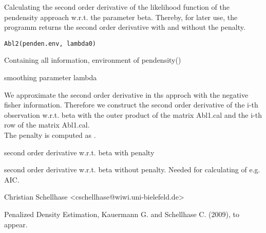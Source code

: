 \begin{Description}\relax
Calculating the second order derivative of the likelihood function of the pendensity approach w.r.t. the parameter beta. Thereby, for later use, the programm returns the second order derivative with and without the penalty.
\end{Description}
\begin{Usage}
\begin{verbatim}
Abl2(penden.env, lambda0)
\end{verbatim}
\end{Usage}
\begin{Arguments}
\begin{ldescription}
\item[\code{penden.env}] Containing all information, environment of pendensity()
\item[\code{lambda0}] smoothing parameter lambda
\end{ldescription}
\end{Arguments}
\begin{Details}\relax
We approximate the second order derivative in ths approch with the negative fisher information. 
Therefore we construct the second order derivative of the i-th observation w.r.t. beta with the outer product of the matrix Abl1.cal and the i-th row of the matrix Abl1.cal.\\
The penalty is computed as .
\end{Details}
\begin{Value}
\begin{ldescription}
\item[\code{Abl2.pen}] second order derivative w.r.t. beta with penalty
\item[\code{Abl2.cal}] second order derivative w.r.t. beta without penalty. Needed for calculating of e.g. AIC.
\end{ldescription}
\end{Value}
\begin{Author}\relax
Christian Schellhase <cschellhase@wiwi.uni-bielefeld.de>
\end{Author}
\begin{References}\relax
Penalized Density Estimation, Kauermann G. and Schellhase C. (2009), to appear.
\end{References}

